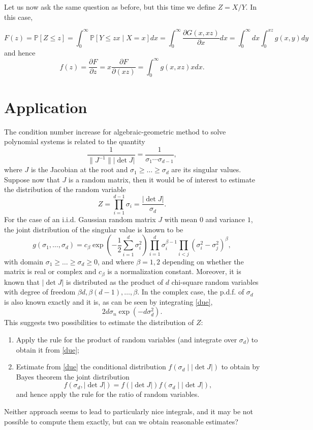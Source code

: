 \documentclass[12pt]{article}
\def\P{\mathbb{P}}
\begin{document}
Let us now ask the same question as before, but this time we define $Z=X/Y$. In this case, 

\[   F(z) =  \P[Z \leq z] =\int_0^\infty \P[Y \leq z x \mid X=x] dx  =\int_0^\infty \frac{\partial G(x,xz)}{\partial x} dx = \int_0^\infty dx \int_0^{xz} g(x,y)dy \]
and hence
\[ f(z) = \frac{\partial F}{\partial z}  = x \frac{\partial F}{\partial (xz)}  = \int_0^\infty g(x,xz) x dx. \]

\section{Application}

The condition number increase for algebraic-geometric method to solve polynomial systems is related to the quantity
\begin{equation}
\frac{1}{\| J^{-1}\| |\det J|} = \frac{1}{\sigma_1 \cdots \sigma_{d-1}},
\end{equation}
where $J$ is the Jacobian at the root and $\sigma_1 \geq \dots \geq \sigma_d$ are its singular values. Suppose now that $J$ is a random matrix, then it would be of interest to estimate the distribution of the random variable \[Z=\prod_{i=1}^{d-1} \sigma_i = \frac{|\det J|}{\sigma_d}.\]
For the case of an i.i.d. Gaussian random matrix $J$ with mean $0$ and variance $1$, the joint distribution of the singular value is known to be 
\begin{equation}\label{due}
g(\sigma_1,\dots,\sigma_d) = c_\beta \exp\left(-\frac12 \sum_{i=1}^d \sigma_i^2\right) \prod_{i=1}^d \sigma_i^{\beta-1} \prod_{i<j} (\sigma_i^2 -\sigma_j^2)^\beta ,
\end{equation}
with domain $\sigma_1 \geq \dots \geq \sigma_d \geq 0$, and where $\beta=1,2$ depending on whether the matrix is real or complex and $c_\beta$ is a normalization constant. Moreover, it is known that $|\det J|$ is distributed as the product of $d$ chi-square random variables with degree of freedom $\beta d, \beta(d-1), \dots, \beta$. In the complex case, the p.d.f. of $\sigma_d$ is also known exactly and it is, as can be seen by integrating \eqref{due},
\[ 2 d \sigma_n \exp(-d \sigma_d^2).\]
This suggests two possibilities to estimate the distribution of $Z$:
\begin{enumerate}
\item Apply the rule for the product of random variables (and integrate over $\sigma_d)$ to obtain it from \eqref{due};
\item Estimate from \eqref{due} the conditional distribution $f(\sigma_d \mid |\det J|)$ to obtain by Bayes theorem the joint distribution
\[  f(\sigma_d, |\det J|) = f(|\det J|) f(\sigma_d \mid |\det J|), \]
and hence apply the rule for the ratio of random variables.
\end{enumerate}
Neither approach seems to lead to particularly nice integrals, and it may be not possible to compute them exactly, but can we obtain reasonable estimates?
\end{document}
